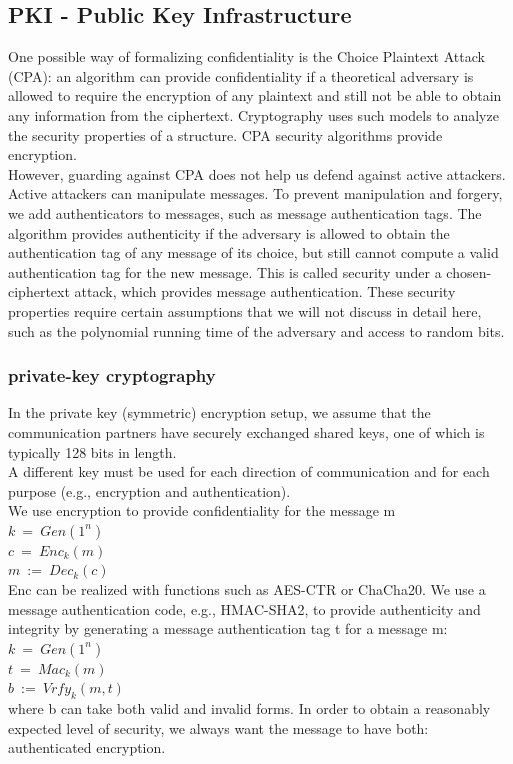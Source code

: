\subsection{PKI - Public Key Infrastructure}
One possible way of formalizing confidentiality is the Choice Plaintext Attack (CPA): 
an algorithm can provide confidentiality if a theoretical adversary is allowed to require 
the encryption of any plaintext and still not be able to obtain any information from the 
ciphertext\cite{b38}. Cryptography uses such models to analyze the security properties of a structure. 
CPA security algorithms provide encryption\cite{b31}.
\\
However, guarding against CPA does not help us defend against active attackers. Active 
attackers can manipulate messages. To prevent manipulation and forgery, we add authenticators 
to messages, such as message authentication tags\cite{b38}. The algorithm provides authenticity if 
the adversary is allowed to obtain the authentication tag of any message of its choice, 
but still cannot compute a valid authentication tag for the new message. This is called 
security under a chosen-ciphertext attack, which provides message authentication.
These security properties require certain assumptions that we will not discuss in detail 
here, such as the polynomial running time of the adversary and access to random bits.

\subsubsection{private-key cryptography}\cite{b38}
In the private key (symmetric) encryption setup, we assume that the communication partners 
have securely exchanged shared keys, one of which is typically 128 bits in length.
\\
A different key must be used for each direction of communication and for each purpose 
(e.g., encryption and authentication).
\\
We use encryption to provide confidentiality for the message m
\\
$k \ = \ Gen(1^n)$
\\
$c \ = \ Enc_k(m)$
\\
$m \ := \ Dec_k(c)$
\\
Enc can be realized with functions such as AES-CTR or ChaCha20.
We use a message authentication code, e.g., HMAC-SHA2, to provide authenticity and 
integrity by generating a message authentication tag t for a message m:
\\
$k \ = \ Gen(1^n)$
\\
$t \ = \ Mac_k(m)$
\\
$b \ := \ Vrfy_k(m, t)$
\\
where b can take both valid and invalid forms.
In order to obtain a reasonably expected level of security, we always want the message 
to have both: authenticated encryption.

